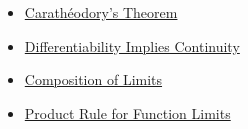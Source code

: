 \begin{dependencies}
\begin{itemize}
  \item \hyperref[thm:caratheodory-characterization-of-differentiability]{Carath\'{e}odory's Theorem}
  \item \hyperref[thm:differentiable-implies-continuous]{Differentiability Implies Continuity}
  \item \hyperref[thm:composition-of-limits]{Composition of Limits}
  \item \hyperref[thm:limit-product]{Product Rule for Function Limits}
\end{itemize}
\end{dependencies}

\clearpage
